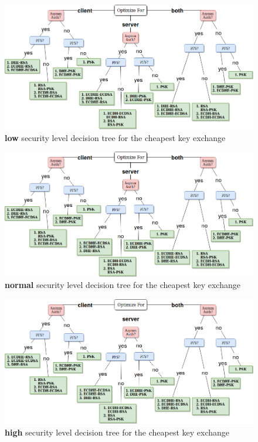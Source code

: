 \begin{figure}
  \centering
  \includegraphics[width=1.0\textwidth]{img/dt_low_sl.png}
  \centering \caption{\label{fig:dt-low-sl} \textbf{low} security level decision tree for the cheapest key exchange}
\end{figure}

\begin{figure}
  \centering
  \includegraphics[width=1.0\textwidth]{img/dt_normal_sl.png}
  \centering \caption{\label{fig:dt-normal-sl} \textbf{normal} security level decision tree for the cheapest key exchange}
\end{figure}

\begin{figure}
  \centering
  \includegraphics[width=1.0\textwidth]{img/dt_high_sl.png}
  \centering \caption{\label{fig:dt-high-sl} \textbf{high} security level decision tree for the cheapest key exchange}
\end{figure}

